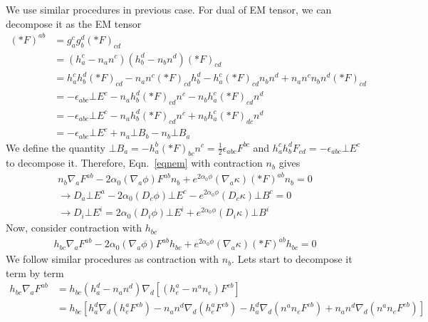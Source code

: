 \documentclass[prd]{revtex4}
\begin{document}
We use similar procedures in previous case. For dual of EM tensor, we can decompose it as the EM tensor
\begin{align}
(\ast F)^{ab} &= g_a^c g_b^d (\ast F)_{cd} \nonumber \\
	   &= (h_a^c - n_a n^c)(h_b^d - n_b n^d) (\ast F)_{cd} \nonumber\\
	   &=h_a^c h_b^d (\ast F)_{cd} - n_a n^c (\ast F)_{cd} h_b^d - h_a^c (\ast F)_{cd} n_b n^d +n_a n^c n_b n^d (\ast F)_{cd} \nonumber \\
	   &= - \epsilon_{abc} \bot E^c - n_a h_b^d (\ast F)_{cd} n^c  - n_b h_a^c (\ast F)_{cd} n^d \nonumber \\  
	   &= - \epsilon_{abc} \bot E^c - n_a h_b^d (\ast F)_{cd} n^c  + n_b h_a^c (\ast F)_{dc} n^d \nonumber \\
	   &= - \epsilon_{abc} \bot E^c +n_a \bot B_b - n_b \bot B_a
\end{align}
We define the quantity $\bot B_a = - h_a^b (\ast F)_{bc} n^c = \frac{1}{2} \epsilon_{abc} F^{bc}$ and $h_a^c h_b^d F_{cd} = -\epsilon_{abc} \bot E^c$ to decompose it. Therefore, Eqn.~\ref{eqnem} with contraction $n_b$ gives 
\begin{align}
n_b \nabla_a F^{ab} - 2 \alpha_0 (\nabla_a \phi) F^{ab} n_b  + e^{2 \alpha_0 \phi} (\nabla_a \kappa) (\ast F)^{ab} n_b=0  \nonumber \\
\rightarrow D_a \bot E^a - 2\alpha_0 (D_c \phi) \bot E^c -e^{2 \alpha_0 \phi} (D_c \kappa) \bot B^c = 0 \nonumber \\
\label{eqnem_n_contrac}
\rightarrow D_i \bot E^i =  2\alpha_0 (D_i \phi) \bot E^i + e^{2 \alpha_0 \phi} (D_i \kappa) \bot B^i
\end{align}
Now, consider contraction with $h_{bc}$
\begin{align}
h_{bc} \nabla_a F^{ab} - 2 \alpha_0 (\nabla_a \phi) F^{ab} h_{bc}  + e^{2 \alpha_0 \phi} (\nabla_a \kappa) (\ast F)^{ab} h_{bc}=0 
\end{align}
We follow similar procedures as contraction with $n_b$. Let\textsc{}s start to decompose it term by term
\begin{align}
\label{eqn8}
h_{bc} \nabla_a F^{ab} &= h_{bc}(h_a^d-n_a n^d) \nabla_d [(h_e^a - n^a n_e) F^{eb}] \nonumber \\
				    &=h_{bc} [ h_a^d \nabla_d (h_e^a F^{eb}) - n_a n^d \nabla_d (h_e^a F^{eb}) - h_a^d \nabla_d (n^a n_e F^{eb}) + n_a n^d \nabla_d (n^a n_e F^{eb})]
\end{align}
\end{document}
